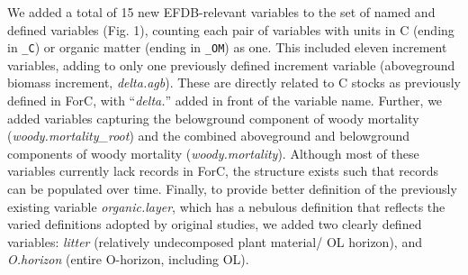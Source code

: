 \documentclass[, manuscript]{copernicus}
\begin{document}
We added a total of 15 new EFDB-relevant variables to the set of named
and defined variables (Fig. 1), counting each pair of variables with
units in C (ending in \texttt{\_C}) or organic matter (ending in
\texttt{\_OM}) as one. This included eleven increment variables, adding
to only one previously defined increment variable (aboveground biomass
increment, \emph{delta.agb}). These are directly related to C stocks as
previously defined in ForC, with ``\emph{delta.}'' added in front of the
variable name. Further, we added variables capturing the belowground
component of woody mortality (\emph{woody.mortality\_root}) and the
combined aboveground and belowground components of woody mortality
(\emph{woody.mortality}). Although most of these variables currently
lack records in ForC, the structure exists such that records can be
populated over time. Finally, to provide better definition of the
previously existing variable \emph{organic.layer}, which has a nebulous
definition that reflects the varied definitions adopted by original
studies, we added two clearly defined variables: \emph{litter}
(relatively undecomposed plant material/ OL horizon), and
\emph{O.horizon} (entire O-horizon, including OL).
\end{document}
